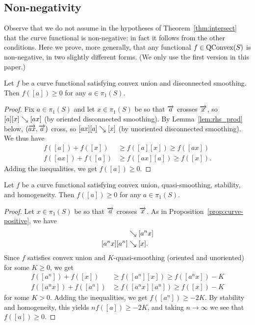 \subsection{Non-negativity}
\label{subsec:nonnegative}

Observe that we do not assume in the hypotheses of
Theorem~\ref{thm:intersect} that the curve
functional is non-negative: in fact it follows
from the other conditions. Here we prove, more generally, that any
functional $f \in \mathrm{QConvex}(S)$ is non-negative, in two slightly
different forms. (We only use the first version in this paper.)

\begin{proposition}
  Let $f$ be a curve functional satisfying convex union and disconnected smoothing. Then $f([a]) \geq 0$ for any $a \in \pi_1(S)$.
  \label{prop:curve-positive}
\end{proposition}
\begin{proof}
Fix $a \in \pi_1(S)$ and let $x \in \pi_1(S)$ be so that $\overrightarrow{a}$
crosses $\overrightarrow{x}$, so
$[a][x] \mathrel{\searrow} [ax]$ (by oriented disconnected smoothing).
By Lemma~\ref{lem:rhs_prod} below,
$(\overrightarrow{ax},\overrightarrow{a})$ cross, so
$[ax][a] \mathrel{\searrow} [x]$ (by unoriented disconnected smoothing). We thus have
\begin{align*}
    f([a]) + f([x]) &\geq f([a] [x]) \geq f([ax])\\
     f([ax]) + f([a]) &\geq f([ax] [a]) \geq f([x]).
\end{align*}
Adding the inequalities, we get $f([a]) \geq 0$.
\end{proof}

\begin{proposition}
  Let $f$ be a curve functional satisfying convex union, quasi-smoothing, stability, and homogeneity. Then $f([a]) \geq 0$ for any $a \in
  \pi_1(S)$.
  \label{prop:curve-positive2}
\end{proposition}

\begin{proof}
Let $x \in \pi_1(S)$ be so that $\overrightarrow{a}$ crosses $\overrightarrow{x}$. As in
Proposition~\ref{prop:curve-positive}, we have
\begin{align*}
[a^n][x] &\reducesto [a^nx]\\
[a^nx][a^n]&\reducesto [x].
\end{align*}
Since $f$ satisfies convex union and $K$-quasi-smoothing (oriented and
unoriented) for
some $K \ge 0$, we get
\begin{align*}
    f([a^n]) + f([x]) &\geq f([a^n] [x]) \geq f([a^nx]) - K\\
     f([a^nx]) + f([a^n]) &\geq f([a^nx] [a^n]) \geq f([x]) - K
\end{align*}
for some $K>0$.
Adding the inequalities, we get $f([a^n]) \geq -2K$. By stability and
homogeneity, this yields $n f([a]) \geq -2K$, and taking $n\to\infty$
we see that $f([a]) \geq 0$.
\end{proof}

